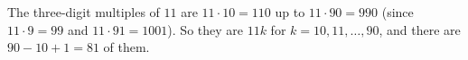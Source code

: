 The three-digit multiples of $11$ are $11\cdot10=110$ up to $11\cdot90=990$ (since $11\cdot9=99$ and $11\cdot91=1001$). So they are $11k$ for $k=10,11,\dots,90$, and there are $90-10+1=\boxed{81}$ of them.
